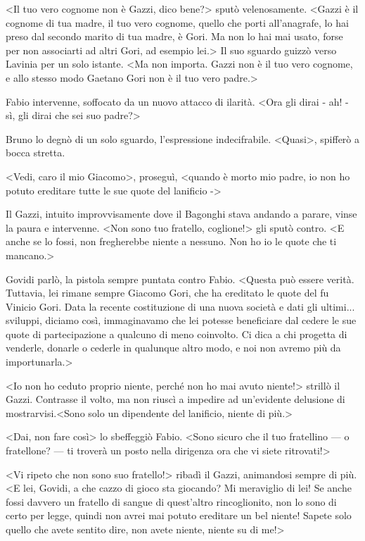 <Il tuo vero cognome non è Gazzi, dico bene?> sputò velenosamente. <Gazzi è il cognome di tua madre, il tuo vero cognome, quello che porti all'anagrafe, lo hai preso dal secondo marito di tua madre, è Gori. Ma non lo hai mai usato, forse per non associarti ad altri Gori, ad esempio lei.> Il suo sguardo guizzò verso Lavinia per un solo istante. <Ma non importa. Gazzi non è il tuo vero cognome, e allo stesso modo Gaetano Gori non è il tuo vero padre.>

Fabio intervenne, soffocato da un nuovo attacco di ilarità. <Ora gli dirai - ah! - sì, gli dirai che sei suo padre?>

Bruno lo degnò di un solo sguardo, l'espressione indecifrabile. <Quasi>, spifferò a bocca stretta.

<Vedi, caro il mio Giacomo>, proseguì, <quando è morto mio padre, io non ho potuto ereditare tutte le sue quote del lanificio ->

Il Gazzi, intuito improvvisamente dove il Bagonghi stava andando a parare, vinse la paura e intervenne. <Non sono tuo fratello, coglione!> gli sputò contro. <E anche se lo fossi, non fregherebbe niente a nessuno. Non ho io le quote che ti mancano.>

Govidi parlò, la pistola sempre puntata contro Fabio. <Questa può essere verità. Tuttavia, lei rimane sempre Giacomo Gori, che ha ereditato le quote del fu Vinicio Gori. Data la recente costituzione di una nuova società e dati gli ultimi... sviluppi, diciamo così, immaginavamo che lei potesse beneficiare dal cedere le sue quote di partecipazione a qualcuno di meno coinvolto. Ci dica a chi progetta di venderle, donarle o cederle in qualunque altro modo, e noi non avremo più da importunarla.>

<Io non ho ceduto proprio niente, perché non ho mai avuto niente!> strillò il Gazzi. Contrasse il volto, ma non riuscì a impedire ad un'evidente delusione di mostrarvisi.<Sono solo un dipendente del lanificio, niente di più.>

<Dai, non fare così> lo sbeffeggiò Fabio. <Sono sicuro che il tuo fratellino --- o fratellone? --- ti troverà un posto nella dirigenza ora che vi siete ritrovati!>

<Vi ripeto che non sono suo fratello!> ribadì il Gazzi, animandosi sempre di più. <E lei, Govidi, a che cazzo di gioco sta giocando? Mi meraviglio di lei! Se anche fossi davvero un fratello di sangue di quest'altro rincoglionito, non lo sono di certo per legge, quindi non avrei mai potuto ereditare un bel niente! Sapete solo quello che avete sentito dire, non avete niente, niente su di me!>

